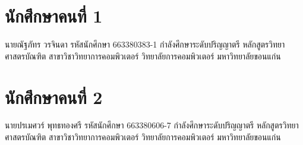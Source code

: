 \section*{นักศึกษาคนที่ 1}

นายณัฐภัทร วรจินดา รหัสนักศึกษา 663380383-1 กำลังศึกษาระดับปริญญาตรี หลักสูตรวิทยาศาสตรบัณฑิต สาขาวิชาวิทยาการคอมพิวเตอร์ วิทยาลัยการคอมพิวเตอร์ มหาวิทยาลัยขอนแก่น

\section*{นักศึกษาคนที่ 2}

นายปรเมศวร์ พุทธทองศรี รหัสนักศึกษา 663380606-7 กำลังศึกษาระดับปริญญาตรี หลักสูตรวิทยาศาสตรบัณฑิต สาขาวิชาวิทยาการคอมพิวเตอร์ วิทยาลัยการคอมพิวเตอร์ มหาวิทยาลัยขอนแก่น

